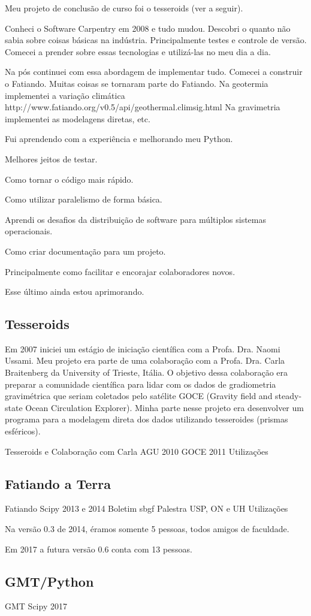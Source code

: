 Meu projeto de conclusão de curso foi o tesseroids (ver a seguir).


Conheci o Software Carpentry em 2008 e tudo mudou.
Descobri o quanto não sabia sobre coisas básicas na indústria.
Principalmente testes e controle de versão.
Comecei a prender sobre essas tecnologias e utilizá-las no meu dia a dia.

Na pós continuei com essa abordagem de implementar tudo.
Comecei a construir o Fatiando.
Muitas coisas se tornaram parte do Fatiando.
Na geotermia implementei a variação climática
http://www.fatiando.org/v0.5/api/geothermal.climsig.html
Na gravimetria implementei as modelagens diretas, etc.

Fui aprendendo com a experiência e melhorando meu Python.

Melhores jeitos de testar.

Como tornar o código mais rápido.

Como utilizar paralelismo de forma básica.

Aprendi os desafios da distribuição de software para múltiplos sistemas
operacionais.

Como criar documentação para um projeto.

Principalmente como facilitar e encorajar colaboradores novos.

Esse último ainda estou aprimorando.







\subsection{Tesseroids}

Em 2007 iniciei um estágio de iniciação científica com a Profa. Dra. Naomi
Ussami.
Meu projeto era parte de uma colaboração com a Profa. Dra. Carla Braitenberg da
University of Trieste, Itália.
O objetivo dessa colaboração era preparar a comunidade científica para lidar
com os dados de gradiometria gravimétrica que seriam coletados pelo satélite
GOCE (Gravity field and steady-state Ocean Circulation Explorer).
Minha parte nesse projeto era desenvolver um programa para a modelagem direta
dos dados utilizando tesseroides (prismas esféricos).

Tesseroids e Colaboração com Carla
AGU 2010
GOCE 2011
Utilizações


\subsection{Fatiando a Terra}

Fatiando
Scipy 2013 e 2014
Boletim sbgf
Palestra USP, ON e UH
Utilizações

Na versão 0.3 de 2014, éramos somente 5 pessoas, todos amigos de faculdade.

Em 2017 a futura versão 0.6 conta com 13 pessoas.


\subsection{GMT/Python}

GMT
Scipy  2017
